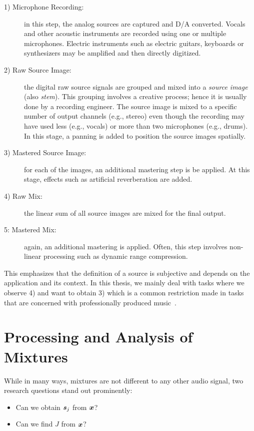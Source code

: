 \begin{description}
  \item[1) Microphone Recording:] in this step, the analog sources are captured and D/A converted. 
  Vocals and other acoustic instruments are recorded using one or multiple microphones.
  Electric instruments such as electric guitars, keyboards or synthesizers may be amplified and then directly digitized.
  \item[2) Raw Source Image:] the digital raw source signals are grouped and mixed into a \emph{source image} (also \emph{stem}).
  This grouping involves a creative process; hence it is usually done by a recording engineer.
  The source image is mixed to a specific number of output channels (e.g., stereo) even though the recording may have used less (e.g., vocals) or more than two microphones (e.g., drums).
  In this stage, a panning is added to position the source images spatially.
  \item[3) Mastered Source Image:] for each of the images, an additional mastering step is be applied.
  At this stage, effects such as artificial reverberation are added.
  \item[4) Raw Mix:] the linear sum of all source images are mixed for the final output.
  \item[5: Mastered Mix:] again, an additional mastering is applied.
  Often, this step involves non-linear processing such as dynamic range compression.
\end{description}

This emphasizes that the definition of a source is subjective and depends on the application and its context. In this thesis, we mainly deal with tasks where we observe 4) and want to obtain 3) which is a common restriction made in tasks that are concerned with professionally produced music~\cite{sisec16}.

\hypertarget{processing-and-analysis-of-mixtures}{%
\section{Processing and Analysis of Mixtures}\label{sec:processing-and-analysis-of-mixtures}}

While in many ways, mixtures are not different to any other audio signal, two research questions stand out prominently:

\begin{itemize}
    \item Can we obtain \({\bm{s}}_j\) from \({\bm{x}}\)? 
    \item Can we find \(J\) from \({\bm{x}}\)?
\end{itemize}

